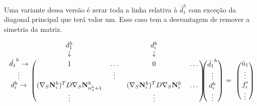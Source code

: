 Uma variante dessa versão é zerar toda a linha relativa à $\bar{d}^h_1$ com exceção da diagonal principal que terá valor um. Esse caso tem a desvantagem de remover a simetria da matriz.

\begin{equation} \label{eq:diagident}
\begin{blockarray}{ccccc}
& d_1^h &  & d_i ^h & & \\
& \downarrow &  & \downarrow & & \\
\begin{block}{c(cccc)}
\bar{d_1}^h \rightarrow & 1 & \hdots & 0 & \hdots \\
\vdots                  &   & \vdots &             \\
d_i^h       \rightarrow & \kij{i}{n_u^h + 1}   &      & \kij{i}{i}   & \hdots \\
& \vdots &      & \vdots   &  \\
\end{block}
\end{blockarray} \begin{blockarray}{c}
 \\
 \\
\begin{block}{(c)}
\bar{d_1}^h \\
\vdots\\
d_i^h \\
\vdots  \\
\end{block}
\end{blockarray} \begin{blockarray}{c}
 \\
 \\
 \\
= \\
 \\
\end{blockarray} \begin{blockarray}{c}
 \\
 \\
\begin{block}{(c)}
 \bar{u}_1 \\
\vdots\\
f^\prime_i \\
\vdots  \\
\end{block}
\end{blockarray}
\end{equation}


